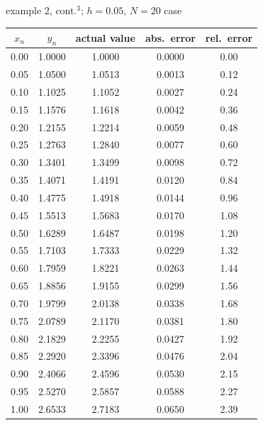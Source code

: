 \documentclass[colorlinks]{beamer}
\begin{document}
\begin{frame}{example 2, cont.$^3$; $h=0.05$, $N=20$ case}

\scriptsize
\begin{tabular}{ccccc}
$x_n$ & $y_n$ & actual value & abs.~error & rel.~error \\ \hline
0.00 & 1.0000 & 1.0000 & 0.0000 & 0.00 \\
0.05 & 1.0500 & 1.0513 & 0.0013 & 0.12 \\
0.10 & 1.1025 & 1.1052 & 0.0027 & 0.24 \\
0.15 & 1.1576 & 1.1618 & 0.0042 & 0.36 \\
0.20 & 1.2155 & 1.2214 & 0.0059 & 0.48 \\
0.25 & 1.2763 & 1.2840 & 0.0077 & 0.60 \\
0.30 & 1.3401 & 1.3499 & 0.0098 & 0.72 \\
0.35 & 1.4071 & 1.4191 & 0.0120 & 0.84 \\
0.40 & 1.4775 & 1.4918 & 0.0144 & 0.96 \\
0.45 & 1.5513 & 1.5683 & 0.0170 & 1.08 \\
0.50 & 1.6289 & 1.6487 & 0.0198 & 1.20 \\
0.55 & 1.7103 & 1.7333 & 0.0229 & 1.32 \\
0.60 & 1.7959 & 1.8221 & 0.0263 & 1.44 \\
0.65 & 1.8856 & 1.9155 & 0.0299 & 1.56 \\
0.70 & 1.9799 & 2.0138 & 0.0338 & 1.68 \\
0.75 & 2.0789 & 2.1170 & 0.0381 & 1.80 \\
0.80 & 2.1829 & 2.2255 & 0.0427 & 1.92 \\
0.85 & 2.2920 & 2.3396 & 0.0476 & 2.04 \\
0.90 & 2.4066 & 2.4596 & 0.0530 & 2.15 \\
0.95 & 2.5270 & 2.5857 & 0.0588 & 2.27 \\
1.00 & 2.6533 & 2.7183 & 0.0650 & 2.39
\end{tabular}
\end{frame}
\end{document}
